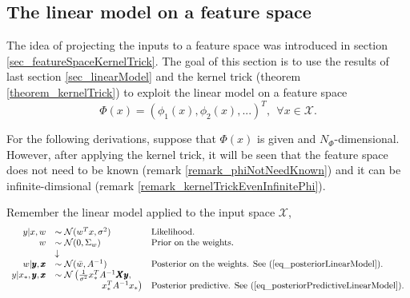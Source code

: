 
\subsection{The linear model on a feature space} \label{sec_linearModelOnFeatureSpace}

The idea of projecting the inputs to a feature space was introduced in section \ref{sec_featureSpaceKernelTrick}. The goal of this section is to use the results of last section \ref{sec_linearModel} and the kernel trick (theorem \ref{theorem_kernelTrick}) to exploit the linear model on a feature space
\begin{equation*}
  \Phi(x) = (\phi_1(x), \phi_2(x), ...)^T, \ \ \forall x \in \mathcal{X}.
\end{equation*} 

For the following derivations, suppose that $\Phi(x)$ is given and $N_{\Phi}$-dimensional. However, after applying the kernel trick, it will be seen that the feature space does not need to be known (remark \ref{remark_phiNotNeedKnown}) and it can be infinite\hyp{}dimsional (remark \ref{remark_kernelTrickEvenInfinitePhi}). 

Remember the linear model applied to the input space $\mathcal{X}$,
\begin{equation} \label{eq_linearModelSummary}
  \begin{array}{rll}
    y | x,w & \sim \mathcal{N}(w^T x, \sigma^2) & \text{Likelihood.} \\
    w       & \sim \mathcal{N}(0,\Sigma_w)      & \text{Prior on the weights.} \\
             &\downarrow \\
    w | \pmb{y}, \pmb{x} & \sim \mathcal{N}(\bar{w},A^{-1}) 
      & \text{Posterior on the weights. See (\ref{eq_posteriorLinearModel}).} \\
    y | x_*, \pmb{y}, \pmb{x} 
      & \sim \mathcal{N} \left( 
                      \frac{1}{\sigma^2}x_*^TA^{-1}\pmb{X}\pmb{y} , \right.\\
                     & \ \ \ \ \ \ \ \ \ \ \ \ \left. \phantom{\frac{1}{\sigma^2}} x_*^T A^{-1} x_*
                     \right) 
        & \text{Posterior predictive. See (\ref{eq_posteriorPredictiveLinearModel}).} \\
  \end{array}
\end{equation}

